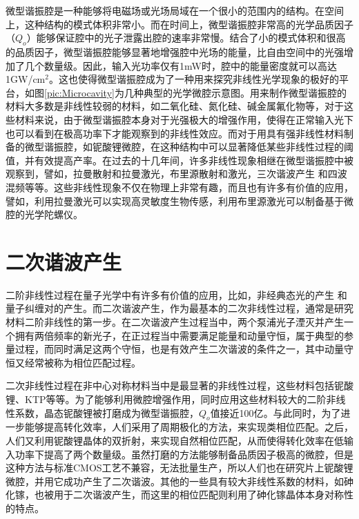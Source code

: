 微型谐振腔是一种能够将电磁场或光场局域在一个很小的范围内的结构。在空间上，这种结构的模式体积非常小。而在时间上，微型谐振腔非常高的光学品质因子（$Q_o$）能够保证腔中的光子泄露出腔的速率非常慢。结合了小的模式体积和很高的品质因子，微型谐振腔能够显著地增强腔中光场的能量，比自由空间中的光强增加了几个数量级。因此，输入光功率仅有1mW时，腔中的能量密度就可以高达1GW/cm$^2$\cite{vahala2003optical}。这也使得微型谐振腔成为了一种用来探究非线性光学现象的极好的平台，如图\ref{pic:Microcavity}为几种典型的光学微腔示意图。用来制作微型谐振腔的材料大多数是非线性较弱的材料，如二氧化硅、氮化硅、碱金属氟化物等，对于这些材料来说，由于微型谐振腔本身对于光强极大的增强作用，使得在正常输入光下也可以看到在极高功率下才能观察到的非线性效应。而对于用具有强非线性材料制备的微型谐振腔，如铌酸锂微腔，在这种结构中可以显著降低某些非线性过程的阈值，并有效提高产率。在过去的十几年间，许多非线性现象相继在微型谐振腔中被观察到，譬如，拉曼散射和拉曼激光\cite{spillane2002ultralow, cai2000fiber, kippenberg2004ultralow}，布里源散射和激光\cite{li2012characterization, li2013microwave, li2014low, loh2015dual}，三次谐波产生\cite{carmon2007visible, farnesi2014optical}	和四波混频\cite{kippenberg2004kerr}等等。这些非线性现象不仅在物理上非常有趣，而且也有许多有价值的应用，譬如，利用拉曼激光可以实现高灵敏度生物传感\cite{ozdemir2014highly}，利用布里源激光可以制备基于微腔的光学陀螺仪\cite{li2015microresonator}。

\section{二次谐波产生}

二阶非线性过程在量子光学中有许多有价值的应用，比如，非经典态光的产生\cite{scully1999quantum}	和量子纠缠对的产生\cite{xu2008second}。而二次谐波产生，作为最基本的二次非线性过程，通常是研究材料二阶非线性的第一步。在二次谐波产生过程当中，两个泵浦光子湮灭并产生一个拥有两倍频率的新光子\cite{boyd2003nonlinear}，在正过程当中需要满足能量和动量守恒，属于典型的参量过程，而同时满足这两个守恒，也是有效产生二次谐波的条件之一，其中动量守恒又经常被称为相位匹配过程。

	二次非线性过程在非中心对称材料当中是最显著的非线性过程，这些材料包括铌酸锂、KTP等等。为了能够利用微腔增强作用，同时应用这些材料较大的二阶非线性系数，晶态铌酸锂被打磨成为微型谐振腔，$Q_o$值接近100亿\cite{ilchenko2004nonlinear}。与此同时，为了进一步能够提高转化效率，人们采用了周期极化的方法，来实现类相位匹配。之后，人们又利用铌酸锂晶体的双折射，来实现自然相位匹配，从而使得转化效率在低输入功率下提高了两个数量级\cite{furst2010naturally}。虽然打磨的方法能够制备品质因子极高的微腔，但是这种方法与标准CMOS工艺不兼容，无法批量生产，所以人们也在研究片上铌酸锂微腔，并用它成功产生了二次谐波\cite{lin2015second}。其他的一些具有较大非线性系数的材料，如砷化镓，也被用于二次谐波产生，而这里的相位匹配则利用了砷化镓晶体本身对称性的特点\cite{kuo2014second}。
	
